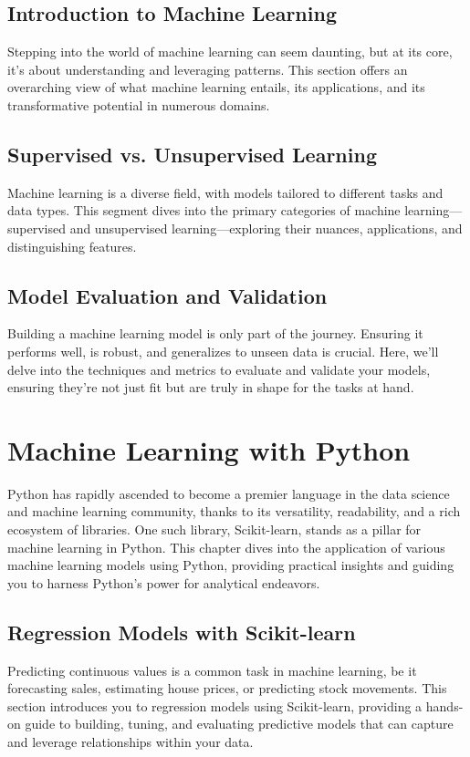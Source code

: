 \documentclass[a4paper,12pt]{book}
\begin{document}
\section{Introduction to Machine Learning}
Stepping into the world of machine learning can seem daunting, but at its core, it's about understanding and leveraging patterns. This section offers an overarching view of what machine learning entails, its applications, and its transformative potential in numerous domains.

\section{Supervised vs. Unsupervised Learning}
Machine learning is a diverse field, with models tailored to different tasks and data types. This segment dives into the primary categories of machine learning—supervised and unsupervised learning—exploring their nuances, applications, and distinguishing features.

\section{Model Evaluation and Validation}
Building a machine learning model is only part of the journey. Ensuring it performs well, is robust, and generalizes to unseen data is crucial. Here, we'll delve into the techniques and metrics to evaluate and validate your models, ensuring they're not just fit but are truly in shape for the tasks at hand.

\chapter{Machine Learning with Python}
Python has rapidly ascended to become a premier language in the data science and machine learning community, thanks to its versatility, readability, and a rich ecosystem of libraries. One such library, Scikit-learn, stands as a pillar for machine learning in Python. This chapter dives into the application of various machine learning models using Python, providing practical insights and guiding you to harness Python's power for analytical endeavors.

\section{Regression Models with Scikit-learn}
Predicting continuous values is a common task in machine learning, be it forecasting sales, estimating house prices, or predicting stock movements. This section introduces you to regression models using Scikit-learn, providing a hands-on guide to building, tuning, and evaluating predictive models that can capture and leverage relationships within your data.
\end{document}
